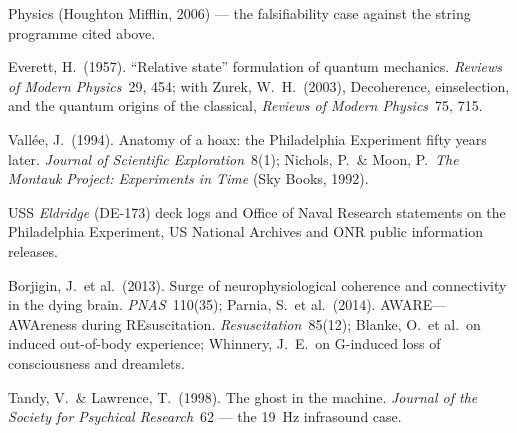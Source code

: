 \begin{srcnotes}
{Physics} (Houghton Mifflin, 2006) --- the falsifiability case against the string programme cited
above.
\item Everett, H.\ (1957). ``Relative state'' formulation of quantum mechanics.
\emph{Reviews of Modern Physics}~29, 454; with Zurek, W.\ H.\ (2003), Decoherence, einselection,
and the quantum origins of the classical, \emph{Reviews of Modern Physics}~75, 715.
\item Vall\'ee, J.\ (1994). Anatomy of a hoax: the Philadelphia Experiment fifty years later.
\emph{Journal of Scientific Exploration}~8(1); Nichols, P.\ \& Moon, P.\ \emph{The Montauk
Project: Experiments in Time} (Sky Books, 1992).
\item USS \emph{Eldridge} (DE-173) deck logs and Office of Naval Research statements on the
Philadelphia Experiment, US National Archives and ONR public information releases.
\item Borjigin, J.\ et al.\ (2013). Surge of neurophysiological coherence and connectivity in the
dying brain. \emph{PNAS}~110(35); Parnia, S.\ et al.\ (2014). AWARE---AWAreness during
REsuscitation. \emph{Resuscitation}~85(12); Blanke, O.\ et al.\ on induced out-of-body experience;
Whinnery, J.\ E.\ on G-induced loss of consciousness and dreamlets.
\item Tandy, V.\ \& Lawrence, T.\ (1998). The ghost in the machine. \emph{Journal of the Society
for Psychical Research}~62 --- the 19~Hz infrasound case.
\end{srcnotes}
